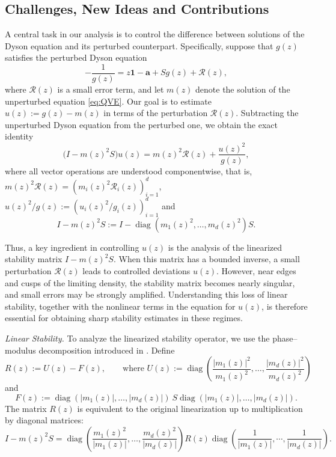 \documentclass[11pt,twoside, a4paper]{article}
\numberwithin{equation}{section}
\numberwithin{figure}{section}
\theoremstyle{plain} %
\theoremstyle{definition}
\theoremstyle{remark}
\newcommand{\1} {\mspace{1 mu}}
\newcommand{\2} {\mspace{2 mu}}
\DeclareMathOperator{\diag}{diag}
\begin{document}
\subsection{Challenges, New Ideas and Contributions}
A central task in our analysis is to control the difference between
solutions of the Dyson equation and its perturbed counterpart.
Specifically, suppose that $g(z)$ satisfies the perturbed Dyson equation
\begin{equation}\label{eq.perturbed DE}
    -\frac{1}{g(z)}
    =
    z\mathbf{1}-\mathbf{a}+Sg(z)+\mathcal{R}(z),
\end{equation}
where $\mathcal{R}(z)$ is a small error term, and let $m(z)$ denote the
solution of the unperturbed equation \eqref{eq:QVE}.
Our goal is to estimate
$
    u(z):=g(z)-m(z)
$
in terms of the perturbation $\mathcal{R}(z)$.
Subtracting the unperturbed Dyson equation from the
perturbed one, we obtain the exact identity
\[
    \bigl(I-m(z)^2S\bigr)u(z)
    =
    m(z)^2\mathcal{R}(z)+\frac{u(z)^2}{g(z)},
\]
where all vector operations are understood componentwise, that is, $m(z)^2\mathcal{R}(z)=(m_i(z)^2\mathcal{R}_i(z))_{i=1}^d$, $u(z)^2/g(z):=(u_i(z)^2/g_i(z))_{i=1}^d$ and
\begin{equation}\label{eq.stability-matrix}
    I-m(z)^2S
    :=
    I-\operatorname{diag}(m_1(z)^2,\dots,m_d(z)^2)S.
\end{equation}

Thus, a key ingredient in controlling $u(z)$ is the analysis
of the linearized stability matrix $I-m(z)^2S$.
When this matrix has a bounded inverse, a small perturbation
$\mathcal{R}(z)$ leads to controlled deviations $u(z)$.
However, near edges and cusps of the limiting density,
the stability matrix becomes nearly singular, and small
errors may be strongly amplified.
Understanding this loss of linear stability, together with
the nonlinear terms in the equation for $u(z)$, is therefore
essential for obtaining sharp stability estimates in these regimes.

\textit{Linear Stability.}
To analyze the linearized stability operator, we use the phase--modulus
decomposition introduced in
\cite{AEK2017singularities,AEK2019quadratic}.
Define
\begin{equation}\label{def.B}
    R(z):=U(z)-F(z), \qquad\mbox{where }
    U(z):=\diag\left(\frac{|m_1(z)|^2}{m_1(z)^2},\dots,\frac{|m_d(z)|^2}{m_d(z)^2}\right)
\end{equation}
and
\begin{equation}\label{def.F}
    F(z):=\diag(|m_1(z)|,\dots,|m_d(z)|)~S \diag(|m_1(z)|,\dots,|m_d(z)|).
\end{equation}
The matrix \(R(z)\) is equivalent to the original linearization up to
multiplication by diagonal matrices:
\begin{equation}\label{eq.I-m2S-transform}
    I-m(z)^2S
    =
    \diag\left(\frac{m_1(z)^2}{|m_1(z)|},\dots,\frac{m_d(z)^2}{|m_d(z)|}\right)
    R(z)
    \diag\left(\frac{1}{|m_1(z)|},\cdots,\frac{1}{|m_d(z)|}\right).
\end{equation}
\end{document}
